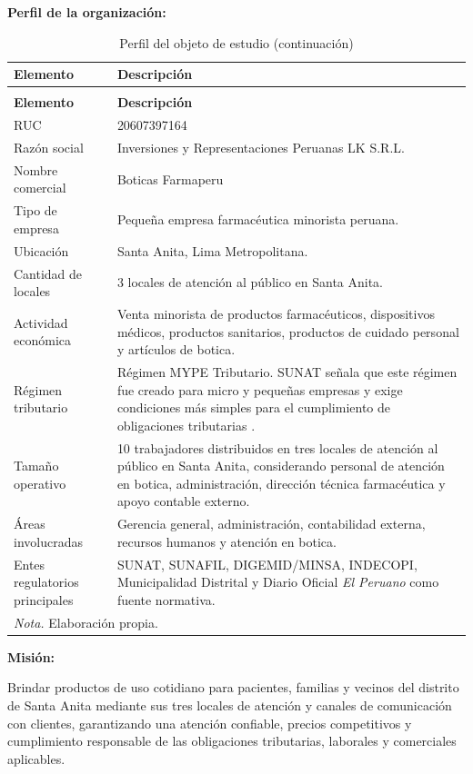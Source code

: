 \documentclass[12pt,a4paper,oneside]{report}
\begin{document}
\textbf{Perfil de la organización:}

\begin{longtable}{@{}p{}p{}@{}}
\caption{Perfil del objeto de estudio}\label{tab:perfil-objeto-estudio}\\
\toprule
\textbf{Elemento} & \textbf{Descripción} \\
\midrule
\endfirsthead
\caption[]{Perfil del objeto de estudio (continuación)}\\
\toprule
\textbf{Elemento} & \textbf{Descripción} \\
\midrule
\endhead
RUC & 20607397164 \\
Razón social & Inversiones y Representaciones Peruanas LK S.R.L. \\
Nombre comercial & Boticas Farmaperu \\
Tipo de empresa & Pequeña empresa farmacéutica minorista peruana. \\
Ubicación & Santa Anita, Lima Metropolitana. \\
Cantidad de locales & 3 locales de atención al público en Santa Anita. \\
Actividad económica & Venta minorista de productos farmacéuticos, dispositivos médicos, productos sanitarios, productos de cuidado personal y artículos de botica. \\
Régimen tributario & Régimen MYPE Tributario. SUNAT señala que este régimen fue creado para micro y pequeñas empresas y exige condiciones más simples para el cumplimiento de obligaciones tributarias \parencite{sunatRMT2026}. \\
Tamaño operativo & 10 trabajadores distribuidos en tres locales de atención al público en Santa Anita, considerando personal de atención en botica, administración, dirección técnica farmacéutica y apoyo contable externo. \\
Áreas involucradas & Gerencia general, administración, contabilidad externa, recursos humanos y atención en botica. \\
Entes regulatorios principales & SUNAT, SUNAFIL, DIGEMID/MINSA, INDECOPI, Municipalidad Distrital y Diario Oficial \textit{El Peruano} como fuente normativa. \\
\bottomrule
\multicolumn{2}{p{0.94\textwidth}}{\normalsize \textit{Nota.} Elaboración propia.}\\
\end{longtable}

\textbf{Misión:}

Brindar productos de uso cotidiano para pacientes, familias y vecinos del distrito de Santa Anita mediante sus tres locales de atención y canales de comunicación con clientes, garantizando una atención confiable, precios competitivos y cumplimiento responsable de las obligaciones tributarias, laborales y comerciales aplicables.
\end{document}
